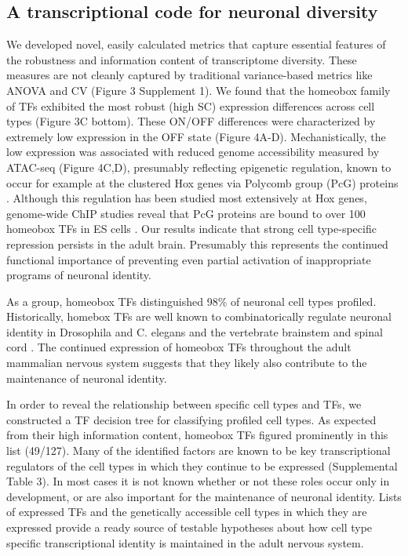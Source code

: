 \subsection{A transcriptional code for neuronal diversity}
We developed novel, easily calculated metrics that capture essential features of the robustness and information content of transcriptome diversity. These measures are not cleanly captured by traditional variance-based metrics like ANOVA and CV (Figure 3 Supplement 1). We found that the homeobox family of TFs exhibited the most robust (high SC) expression differences across cell types (Figure 3C bottom). These ON/OFF differences were characterized by extremely low expression in the OFF state (Figure 4A-D). Mechanistically, the low expression was associated with reduced genome accessibility measured by ATAC-seq (Figure 4C,D), presumably reflecting epigenetic regulation, known to occur for example at the clustered Hox genes via Polycomb group (PcG) proteins \citep{Montavon_2014}. Although this regulation has been studied most extensively at Hox genes, genome-wide ChIP studies reveal that PcG proteins are bound to over 100 homeobox TFs in ES cells \citep{Boyer_2006}. Our results indicate that strong cell type-specific repression persists in the adult brain. Presumably this represents the continued functional importance of preventing even partial activation of inappropriate programs of neuronal identity. 

As a group, homeobox TFs distinguished 98\% of neuronal cell types profiled. Historically, homebox TFs are well known to combinatorically regulate neuronal identity in Drosophila and C. elegans \citep{Kratsios_2017} and the vertebrate brainstem and spinal cord \citep{Dasen_2009,Philippidou_2013}. The continued expression of homeobox TFs throughout the adult mammalian nervous system suggests that they likely also contribute to the maintenance of neuronal identity.

In order to reveal the relationship between specific cell types and TFs, we constructed a TF decision tree for classifying profiled cell types. As expected from their high information content, homeobox TFs figured prominently in this list (49/127). Many of the identified factors are known to be key transcriptional regulators of the cell types in which they continue to be expressed (Supplemental Table 3). In most cases it is not known whether or not these roles occur only in development, or are also important for the maintenance of neuronal identity. Lists of expressed TFs and the genetically accessible cell types in which they are expressed provide a ready source of testable hypotheses about how cell type specific transcriptional identity is maintained in the adult nervous system.

